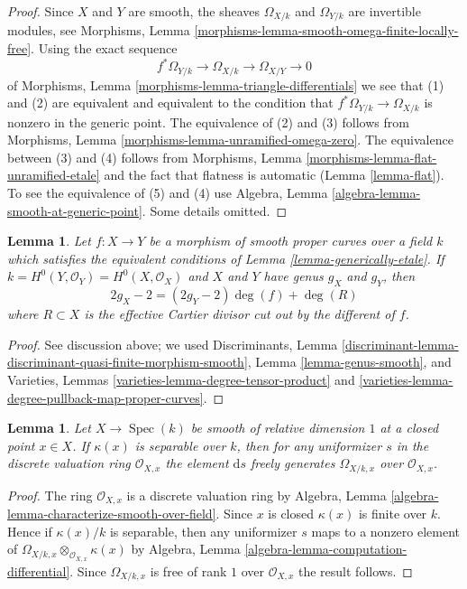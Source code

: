 \documentclass{stacks-project}
\theoremstyle{plain}
\newtheorem{lemma}[subsection]{Lemma}
\theoremstyle{definition}
\theoremstyle{remark}
\numberwithin{equation}{subsection}
\def\Spec{\mathop{\mathrm{Spec}}}
\begin{document}
\begin{proof}
Since $X$ and $Y$ are smooth, the sheaves $\Omega_{X/k}$ and
$\Omega_{Y/k}$ are invertible modules, see
Morphisms, Lemma \ref{morphisms-lemma-smooth-omega-finite-locally-free}.
Using the exact sequence
$$
f^*\Omega_{Y/k} \longrightarrow \Omega_{X/k}
\longrightarrow \Omega_{X/Y} \longrightarrow 0
$$
of Morphisms, Lemma \ref{morphisms-lemma-triangle-differentials}
we see that (1) and (2) are equivalent and equivalent to the
condition that $f^*\Omega_{Y/k} \to \Omega_{X/k}$ is nonzero
in the generic point. The equivalence of (2) and (3) follows
from Morphisms, Lemma \ref{morphisms-lemma-unramified-omega-zero}.
The equivalence between (3) and (4) follows from
Morphisms, Lemma \ref{morphisms-lemma-flat-unramified-etale}
and the fact that flatness is automatic
(Lemma \ref{lemma-flat}).
To see the equivalence of (5) and (4)
use Algebra, Lemma \ref{algebra-lemma-smooth-at-generic-point}.
Some details omitted.
\end{proof}

\begin{lemma}
\label{lemma-rh}
Let $f : X \to Y$ be a morphism of smooth proper curves
over a field $k$ which satisfies the equivalent conditions of
Lemma \ref{lemma-generically-etale}. If
$k = H^0(Y, \mathcal{O}_Y) = H^0(X, \mathcal{O}_X)$
and $X$ and $Y$ have genus $g_X$ and $g_Y$, then
$$
2g_X - 2 = (2g_Y - 2) \deg(f) + \deg(R)
$$
where $R \subset X$ is the effective Cartier divisor cut out by
the different of $f$.
\end{lemma}

\begin{proof}
See discussion above; we used
Discriminants, Lemma
\ref{discriminant-lemma-discriminant-quasi-finite-morphism-smooth},
Lemma \ref{lemma-genus-smooth}, and
Varieties, Lemmas \ref{varieties-lemma-degree-tensor-product} and
\ref{varieties-lemma-degree-pullback-map-proper-curves}.
\end{proof}

\begin{lemma}
\label{lemma-uniformizer-works}
Let $X \to \Spec(k)$ be smooth of relative dimension $1$ at a closed
point $x \in X$. If $\kappa(x)$ is separable over $k$, then for
any uniformizer $s$ in the discrete valuation ring $\mathcal{O}_{X, x}$
the element $\text{d}s$ freely generates $\Omega_{X/k, x}$
over $\mathcal{O}_{X, x}$.
\end{lemma}

\begin{proof}
The ring $\mathcal{O}_{X, x}$ is a discrete valuation ring by
Algebra, Lemma \ref{algebra-lemma-characterize-smooth-over-field}.
Since $x$ is closed $\kappa(x)$ is finite over $k$. Hence if
$\kappa(x)/k$ is separable, then any uniformizer $s$
maps to a nonzero element of
$\Omega_{X/k, x} \otimes_{\mathcal{O}_{X, x}} \kappa(x)$ by
Algebra, Lemma \ref{algebra-lemma-computation-differential}.
Since $\Omega_{X/k, x}$ is free of rank $1$ over $\mathcal{O}_{X, x}$
the result follows.
\end{proof}
\end{document}
